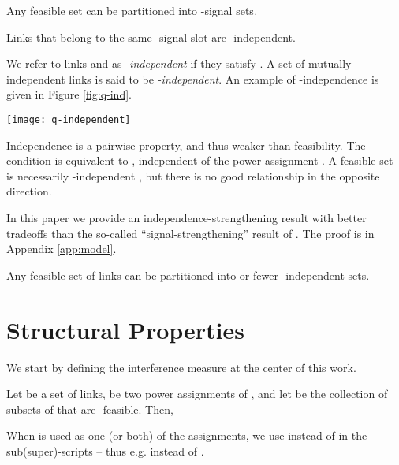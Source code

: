 \documentclass[11pt]{amsart}
\begin{document}
\begin{proposition}[\cite{HW09}]
Any feasible set  can be partitioned into
 -signal sets.
\label{prop:signal-length}
\end{proposition}

\begin{lemma}
Links that belong to the same -signal slot are -independent.
\label{lem:ind-separation}
\end{lemma}
\fi
We refer to links  and  as
\emph{-independent} if they satisfy
.
A set of mutually -independent links is said to be \emph{-independent}. An example of -independence is given in Figure \ref{fig:q-ind}.

\begin{figure*}[ht]
	\begin{center}
		\texttt{[image: q-independent]}
	\end{center}
	\caption{Links  and  are -independent. Set  is -independent.}\label{fig:q-ind}
\end{figure*}


Independence is a pairwise property, and thus weaker than feasibility.
The condition is equivalent to ,
independent of the power assignment .
A feasible set is necessarily -independent
  \cite{us:esa09full}, but there is no good relationship in the opposite
  direction.

In this paper we provide an independence-strengthening result with better
tradeoffs than the so-called ``signal-strengthening'' result of \cite{HW09}.
The proof is in Appendix \ref{app:model}.

\begin{lemma}
Any feasible set of links can be partitioned into  or fewer -independent sets.
\label{lem:indep}
\end{lemma}



\section{Structural Properties}
\label{sec:structural}

\def\gprop{\mathcal{P}}

We start by defining the interference measure at the center of this work. 

\begin{defn}
Let  be a set of links,  be two power assignments of , and let  be the collection of subsets of  that are -feasible. 
Then,

\end{defn} 
When  is used as one (or both) of the assignments, we use  instead of  in the sub(super)-scripts -- thus e.g.  instead of .
\end{document}
